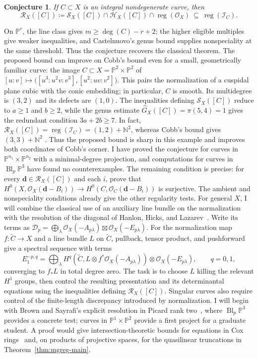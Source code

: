 \documentclass[11pt,reqno]{amsart}
\newtheorem{conjecture}[lemma]{Conjecture}
\theoremstyle{remark}
\newcommand{\reg}{\operatorname{reg}}
\newcommand{\Bl}{\operatorname{Bl}}
\newcommand{\dd}{\mathbf{d}}
\newcommand{\NN}{\mathbb{N}}
\newcommand{\PP}{\mathbb{P}}
\newcommand{\cD}{\mathcal{D}}
\newcommand{\cH}{\mathcal{H}}
\newcommand{\cI}{\mathcal{I}}
\newcommand{\cO}{\mathcal{O}}
\newcommand{\cR}{\mathcal{R}}
\newcommand{\cS}{\mathcal{S}}
\begin{document}
\begin{conjecture}\label{conj:multigraded-glp}
If $C\subset X$ is an integral nondegenerate curve, then
\[
\cR_X([C])\coloneqq\cS_X([C])\cap\cH_X([C])\cap\reg(\cO_X)\ \subseteq\ \reg(\cI_C).
\]
\end{conjecture}

On $\PP^r$, the line class gives $m\geq\deg(C)-r+2$; the higher eligible multiples give weaker inequalities, and Castelnuovo's genus bound supplies nonspeciality at the same threshold. Thus the conjecture recovers the classical theorem. The proposed bound can improve on Cobb's bound even for a small, geometrically familiar curve: the image $C\subset X=\PP^2\times\PP^2$ of $[u:v]\mapsto\bigl([u^3:u^2v:v^3],[u^2:uv:v^2]\bigr)$. This pairs the normalization of a cuspidal plane cubic with the conic embedding; in particular, $C$ is smooth. Its multidegree is $(3,2)$ and its defects are $(1,0)$. The inequalities defining $\cS_X([C])$ reduce to $a\geq1$ and $b\geq2$, while the genus estimate $\widehat G_X([C])=\pi(5,4)=1$ gives the redundant condition $3a+2b\geq7$. In fact, $\cR_X([C])=\reg(\cI_C)=(1,2)+\NN^2$, whereas Cobb's bound gives $(3,3)+\NN^2$ \cite[Proposition~B]{cobb24}. Thus the proposed bound is sharp in this example and improves both coordinates of Cobb's corner. I have proved the conjecture for curves in $\PP^{n_1}\times\PP^{n_2}$ with a minimal-degree projection, and computations for curves in $\Bl_p\PP^3$ have found no counterexamples. The remaining condition is precise: for every $\dd\in\cR_X([C])$ and each $i$, prove that $H^0(X,\cO_X(\dd-B_i))\to H^0(C,\cO_C(\dd-B_i))$ is surjective. The ambient and nonspeciality conditions already give the other regularity tests. For general $X$, I will combine the classical use of an auxiliary line bundle on the normalization with the resolution of the diagonal of Hanlon, Hicks, and Lazarev~\cite{GLP83,cobb24,HHL24}. Write its terms as $\cD_p=\bigoplus_\lambda\cO_X(-A_{p\lambda})\boxtimes\cO_X(-E_{p\lambda})$. For the normalization map $f\colon\widetilde C\to X$ and a line bundle $L$ on $\widetilde C$, pullback, tensor product, and pushforward give a spectral sequence with terms
\[
E_1^{-p,q}=\bigoplus_\lambda
H^q\!\left(\widetilde C,L\otimes f^*\cO_X(-A_{p\lambda})\right)
\otimes\cO_X(-E_{p\lambda}),\qquad q=0,1,
\]
converging to $f_*L$ in total degree zero. The task is to choose $L$ killing the relevant $H^1$ groups, then control the resulting presentation and its determinantal equations using the inequalities defining $\cR_X([C])$. Singular curves also require control of the finite-length discrepancy introduced by normalization. I will begin with Brown and Sayrafi's explicit resolution in Picard rank two~\cite{brownSayrafi24}, where $\Bl_p\PP^3$ provides a concrete test; curves in $\PP^1\times\PP^2$ provide a first project for a graduate student. A proof would give intersection-theoretic bounds for equations in Cox rings~\cite{maclaganSmith04} and, on products of projective spaces, for the quasilinear truncations in Theorem~\ref{thm:mgreg-main}.
\end{document}
